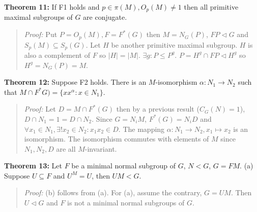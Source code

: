 {\bf Theorem 11:}
If F1 holds and $p \in \pi(M), O_p(M) \neq 1$ then all primitive maximal subgroups of $G$ are
conjugate.
\begin{quote}
\emph{Proof:}
Put $P= O_p(M), F= F^*(G)$ then $M= N_G(P)$, $FP \lhd G$ and $S_p(M) \subseteq S_p(G)$.  Let
$H$ be another primitive maximal subgroup.  $H$ is also a complement of $F$ so $|H|=|M|$.
$\exists g: P \leq P^g$.  $P= H^g \cap FP \lhd H^g$ so $H^g= N_G(P)= M$.
\end{quote}
{\bf Theorem 12:}
Suppose F2 holds.   There is an $M$-isomorphism $\alpha: N_1 \rightarrow N_2$ such that
$M \cap F^*G) = \{ x x^{\alpha}: x \in N_1 \}$.
\begin{quote}
\emph{Proof:}
Let $D= M \cap F^*(G)$ then by a previous result ($C_G(N)=1$), $ D \cap N_1 = 1 = D \cap N_2$.
Since $G= N_iM$, $F^*(G)= N_iD$ and $\forall x_1 \in N_1, \exists ! x_2 \in N_2: x_1 x_2 \in D$.
The mapping $\alpha: N_1 \rightarrow N_2, x_1 \mapsto x_2$ is an isomorphism.  The isomorphism
commutes with  elements of $M$ since $N_1, N_2, D$ are all $M$-invariant.
\end{quote}
{\bf Theorem 13:}
Let $F$ be a minimal normal subgroup of $G$, $N<G$, $G= FM$.
(a) Suppose $U \subseteq F$ and $U^M=U$, then $UM<G$.
\begin{quote}
\emph{Proof:}
(b) follows from (a).  For (a), assume the contrary, $G=UM$.  Then $U \lhd G$ and $F$ is not a minimal
normal subgroups of $G$.
\end{quote}
